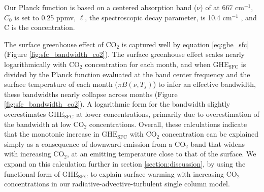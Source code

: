 \documentclass[draft]{agujournal2019}
\begin{document}
Our Planck function is based on a centered absorption band ($\nu$) of  at 667 cm$^{-1}$, $C_0$ is set to 0.25 ppmv, $\ell$, the spectroscopic decay parameter, is 10.4 cm$^{-1}$ \cite{jeevanjee_analytical_2020}, and C is the  concentration. 

The surface greenhouse effect of CO$_2$ is captured well by equation \ref{eq:ghe_sfc} (Figure \ref{fig:sfc_bandwidth_co2}). The surface greenhouse effect scales nearly logarithmically with CO$_2$ concentration for each month, and when ${\text{GHE}_\text{{SFC}}}$ is divided by the Planck function evaluated at the band center frequency and the surface temperature of each month ($\pi B(\nu,T_s)$) to infer an effective bandwidth, these bandwidths nearly collapse across months (Figure \ref{fig:sfc_bandwidth_co2}). A logarithmic form for the bandwidth slightly overestimates ${\text{GHE}_\text{{SFC}}}$ at lower  concentrations, primarily due to overestimation of the bandwidth at low CO$_2$ concentrations. Overall, these calculations indicate that the monotonic increase in ${\text{GHE}_\text{{SFC}}}$ with CO$_2$ concentration can be explained simply as a consequence of downward emission from a CO$_2$ band that widens with increasing CO$_2$, at an emitting temperature close to that of the surface. We expand on this calculation further in section \ref{section:discussion}, by using the functional form of ${\text{GHE}_\text{{SFC}}}$ to explain surface warming with increasing CO$_2$ concentrations in our radiative-advective-turbulent single column model.
\end{document}
